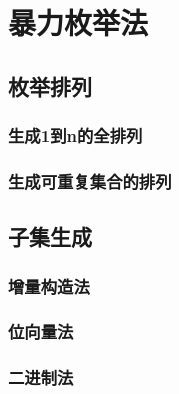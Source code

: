 \chapter{暴力枚举法}


\section{枚举排列} %


\subsection{生成1到n的全排列}


\subsection{生成可重复集合的排列}


\section{子集生成} %


\subsection{增量构造法}


\subsection{位向量法}


\subsection{二进制法}
